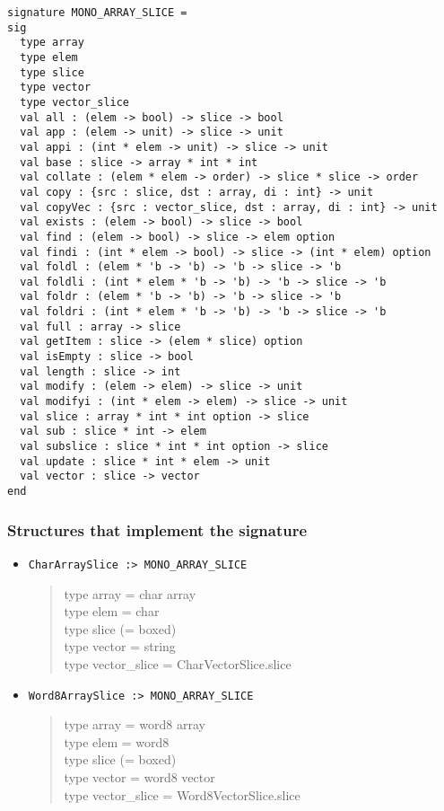 \documentclass{jbook}
\newcommand{\txt}[2]{#2}
\newcommand{\code}[1]{\mbox{\large\tt #1}}
\newenvironment{program}{\begin{quote}\begin{tt}}%
                        {\end{tt}\end{quote}}
\newcommand{\Structure}{\subsubsection*{\txt{シグネチャを実装するストラクチャ}{Structures that implement the signature}}}
\begin{document}
\begin{verbatim}
signature MONO_ARRAY_SLICE =
sig
  type array
  type elem
  type slice
  type vector
  type vector_slice
  val all : (elem -> bool) -> slice -> bool
  val app : (elem -> unit) -> slice -> unit
  val appi : (int * elem -> unit) -> slice -> unit
  val base : slice -> array * int * int
  val collate : (elem * elem -> order) -> slice * slice -> order
  val copy : {src : slice, dst : array, di : int} -> unit
  val copyVec : {src : vector_slice, dst : array, di : int} -> unit
  val exists : (elem -> bool) -> slice -> bool
  val find : (elem -> bool) -> slice -> elem option
  val findi : (int * elem -> bool) -> slice -> (int * elem) option
  val foldl : (elem * 'b -> 'b) -> 'b -> slice -> 'b
  val foldli : (int * elem * 'b -> 'b) -> 'b -> slice -> 'b
  val foldr : (elem * 'b -> 'b) -> 'b -> slice -> 'b
  val foldri : (int * elem * 'b -> 'b) -> 'b -> slice -> 'b
  val full : array -> slice
  val getItem : slice -> (elem * slice) option
  val isEmpty : slice -> bool
  val length : slice -> int
  val modify : (elem -> elem) -> slice -> unit
  val modifyi : (int * elem -> elem) -> slice -> unit
  val slice : array * int * int option -> slice
  val sub : slice * int -> elem
  val subslice : slice * int * int option -> slice
  val update : slice * int * elem -> unit
  val vector : slice -> vector
end
\end{verbatim}

\Structure
\begin{itemize}
\item \code{CharArraySlice :> MONO\_ARRAY\_SLICE}
\begin{program}
    type array = char array
\\
    type elem = char
\\
    type slice (= boxed)
\\
    type vector = string
\\
    type vector\_slice = CharVectorSlice.slice
\end{program}
\item \code{Word8ArraySlice :> MONO\_ARRAY\_SLICE}
\begin{program}
    type array = word8 array
\\
    type elem = word8
\\
    type slice  (= boxed)
\\
    type vector = word8 vector
\\
    type vector\_slice = Word8VectorSlice.slice
\end{program}
\end{itemize}
\end{document}
